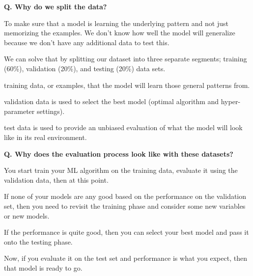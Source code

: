 \begin{frame}[fragile]{\textbf{Q. Why do we split the data?}}
  \begin{wideitemize}
    \item To make sure that a model is learning the underlying pattern and not
    just memorizing the examples. We don't know how well the model will generalize
    because we don't have any additional data to test this.
    \item We can solve that by splitting our dataset into three separate segments;
    training (60\%), validation (20\%), and testing (20\%) data sets.
    \begin{wideitemize}
      \item training data, or examples, that the model will learn
      those general patterns from.
      \item validation data is used to select the best model (optimal algorithm
      and hyper-parameter settings).
      \item test data is used to provide an unbiased evaluation of what
      the model will look like in its real environment.
    \end{wideitemize}
  \end{wideitemize}
\end{frame}


\begin{frame}[fragile]{\textbf{Q. Why does the evaluation process look like with these datasets?}}
  \begin{wideitemize}
    \item You start train your ML algorithm on the training data, evaluate it
    using the validation data, then at this point.
    \item If none of your models are any good based on the performance on the
    validation set, then you need to revisit the training phase and consider
    some new variables or new models.
    \item If the performance is quite good, then you can select your best model
    and pass it onto the testing phase.
    \item Now, if you evaluate it on the test set and performance is what you
    expect, then that model is ready to go.
  \end{wideitemize}
\end{frame}


